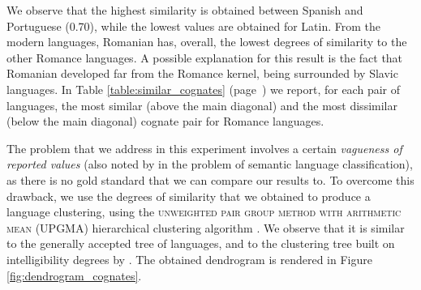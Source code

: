\documentclass[output=paper]{langsci/langscibook}
\begin{document}
We observe that the highest similarity is obtained between Spanish and Portuguese (0.70), while the lowest values are obtained for Latin. From the modern languages, Romanian has, overall, the lowest degrees of similarity to the other Romance languages. A possible explanation for this result is the fact that Romanian developed far from the Romance kernel, being surrounded by Slavic languages. 
In Table \ref{table:similar_cognates} (page~\pageref{table:similar_cognates}) we report, for each pair of languages, the most similar (above the main diagonal) and the most dissimilar (below the main diagonal) cognate pair for Romance languages.



\begin{table}[p]
\caption{Most similar and most dissimilar cognates for all language pairs.\label{table:similar_cognates}}
\end{table}

The problem that we address in this experiment involves a certain \textit{vagueness of reported values} (also noted by \citealt{cognatesuban:eger_et_al} in the problem of semantic language classification), as there is no gold standard that we can compare our results to. To overcome this drawback, we use the degrees of similarity that we obtained to produce a language clustering, using the \textsc{unweighted pair group method with arithmetic mean} (UPGMA) hierarchical clustering algorithm \citep{cognatesuban:sokal_and_michener}. We observe that it is similar to the generally accepted tree of languages, and to the clustering tree built on intelligibility degrees by \citet{cognatesuban:ciobanu_and_dinu_intelligibility}. The obtained dendrogram is rendered in Figure \ref{fig:dendrogram_cognates}.
\end{document}
